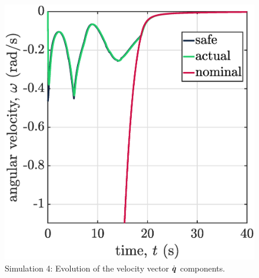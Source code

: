 \begin{figure}[!ht]
\begin{minipage}[t]{.45\textwidth}
    \end{minipage}
    \hfill
    \begin{minipage}[t]{.45\textwidth}
        \centering
        \includegraphics[width=\textwidth]{figures/sim4v2.eps}
    \end{minipage}  
    \caption{\label{fig:sim4v}Simulation 4: Evolution of the velocity vector $\dot{\boldsymbol{q}}$ components.}
    

\end{figure}
